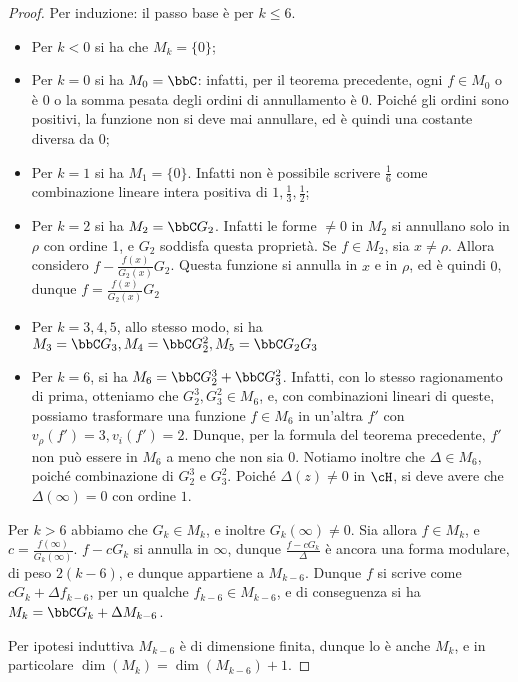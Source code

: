 \begin{proof}
	Per induzione: il passo base è per $k\leq6$.
	\begin{itemize}
		\item Per $k<0$ si ha che $M_k=\{0\}$;
		
		\item Per $k=0$ si ha $M_0=\bbC$: infatti, per il teorema precedente, ogni $f\in M_0$ o è $0$ o la somma pesata degli ordini di annullamento è $0$. Poiché gli ordini sono positivi, la funzione non si deve mai annullare, ed è quindi una costante diversa da $0$;
		
		\item Per $k=1$ si ha $M_1=\{0\}$. Infatti non è possibile scrivere $\frac{1}{6}$ come combinazione lineare intera positiva di $1, \frac{1}{3}, \frac{1}{2}$;
		
		\item Per $k=2$ si ha $M_2=\bbC G_2$. Infatti le forme $\neq0$ in $M_2$ si annullano solo in $\rho$ con ordine 1,
		e $G_2$ soddisfa questa proprietà. Se $f\in M_2$, sia $x\neq\rho$. Allora considero $f-\frac{f(x)}{G_2(x)}G_2$. Questa funzione si annulla in $x$ e in $\rho$, ed è quindi $0$, dunque $f=\frac{f(x)}{G_2(x)}G_2$
		
		\item Per $k=3, 4, 5$, allo stesso modo, si ha $M_3=\bbC G_3, M_4=\bbC G_2^2, M_5= \bbC G_2G_3$
		
		\item Per $k=6$, si ha $M_6=\bbC G_2^3 + \bbC G_3^2$. Infatti, con lo stesso ragionamento di prima, otteniamo che $G_2^3, G_3^2 \in M_6$, e, con combinazioni lineari di queste, possiamo trasformare una funzione $f \in M_6$ in un'altra $f'$ con $v_\rho(f')=3, v_i(f')=2$.
		Dunque, per la formula del teorema precedente, $f'$ non può essere in $M_6$ a meno che non sia $0$.
		Notiamo inoltre che $\Delta\in M_6$, poiché combinazione di $G_2^3$ e $G_3^2$.
		Poiché $\Delta(z)\neq0$ in $\cH$, si deve avere che $\Delta(\infty)=0$ con ordine $1$.
	\end{itemize}
	
	Per $k>6$ abbiamo che $G_k \in M_k$, e inoltre $G_k(\infty)\neq0$.
	Sia allora $f \in M_k$, e $c=\frac{f(\infty)}{G_k(\infty)}$. $f-cG_k$ si annulla in $\infty$, dunque $\frac{f-cG_k}{\Delta}$ è ancora una forma modulare, di peso $2(k-6)$, e dunque appartiene a $M_{k-6}$.
	Dunque $f$ si scrive come $cG_k+\Delta f_{k-6}$, per un qualche $f_{k-6} \in M_{k-6}$, e di conseguenza si ha $M_k=\bbC G_k + \Delta M_{k-6}$.
	
	Per ipotesi induttiva $M_{k-6}$ è di dimensione finita, dunque lo è anche $M_k$, e in particolare $\dim(M_k)=\dim(M_{k-6})+1$.
\end{proof}

